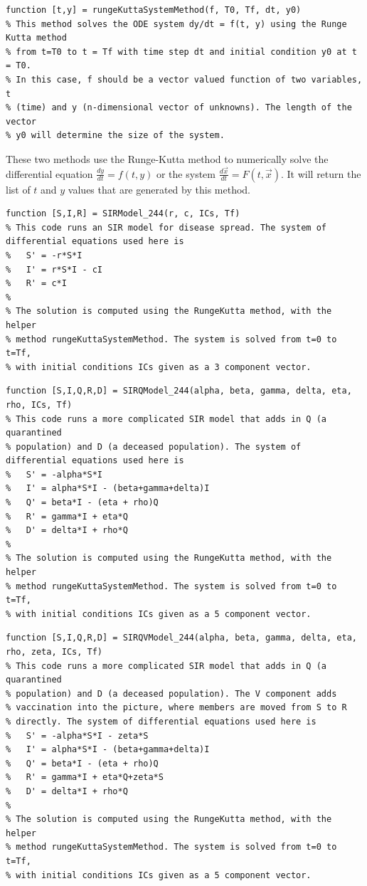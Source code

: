 \documentclass{ximera}
\begin{document}
\begin{verbatim}
function [t,y] = rungeKuttaSystemMethod(f, T0, Tf, dt, y0)
% This method solves the ODE system dy/dt = f(t, y) using the Runge Kutta method
% from t=T0 to t = Tf with time step dt and initial condition y0 at t = T0.
% In this case, f should be a vector valued function of two variables, t
% (time) and y (n-dimensional vector of unknowns). The length of the vector
% y0 will determine the size of the system.
\end{verbatim}

These two methods use the Runge-Kutta method to numerically solve the differential equation $\frac{dy}{dt} = f(t,y)$ or the system $\frac{d\vec{x}}{dt} = F(t, \vec{x})$. It will return the list of $t$ and $y$ values that are generated by this method. 

\begin{verbatim}
function [S,I,R] = SIRModel_244(r, c, ICs, Tf)
% This code runs an SIR model for disease spread. The system of differential equations used here is
%   S' = -r*S*I
%   I' = r*S*I - cI
%   R' = c*I
%
% The solution is computed using the RungeKutta method, with the helper
% method rungeKuttaSystemMethod. The system is solved from t=0 to t=Tf,
% with initial conditions ICs given as a 3 component vector.
\end{verbatim}

\begin{verbatim}
function [S,I,Q,R,D] = SIRQModel_244(alpha, beta, gamma, delta, eta, rho, ICs, Tf)
% This code runs a more complicated SIR model that adds in Q (a quarantined
% population) and D (a deceased population). The system of differential equations used here is
%   S' = -alpha*S*I
%   I' = alpha*S*I - (beta+gamma+delta)I
%   Q' = beta*I - (eta + rho)Q
%   R' = gamma*I + eta*Q
%   D' = delta*I + rho*Q
%
% The solution is computed using the RungeKutta method, with the helper
% method rungeKuttaSystemMethod. The system is solved from t=0 to t=Tf,
% with initial conditions ICs given as a 5 component vector.
\end{verbatim}

\begin{verbatim}
function [S,I,Q,R,D] = SIRQVModel_244(alpha, beta, gamma, delta, eta, rho, zeta, ICs, Tf)
% This code runs a more complicated SIR model that adds in Q (a quarantined
% population) and D (a deceased population). The V component adds
% vaccination into the picture, where members are moved from S to R
% directly. The system of differential equations used here is
%   S' = -alpha*S*I - zeta*S
%   I' = alpha*S*I - (beta+gamma+delta)I
%   Q' = beta*I - (eta + rho)Q
%   R' = gamma*I + eta*Q+zeta*S
%   D' = delta*I + rho*Q
%
% The solution is computed using the RungeKutta method, with the helper
% method rungeKuttaSystemMethod. The system is solved from t=0 to t=Tf,
% with initial conditions ICs given as a 5 component vector.
\end{verbatim}
\end{document}
